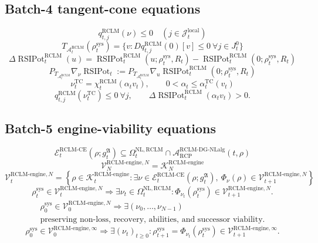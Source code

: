 \documentclass[11pt,a4paper]{article}
\newcommand{\Acal}{\mathcal A}
\newcommand{\Kcal}{\mathcal K}
\newcommand{\Vcal}{\mathcal V}
\newcommand{\RCP}{\mathrm{RCP}}
\newcommand{\RCLM}{\mathrm{RCLM}}
\newcommand{\DG}{\mathrm{DG}}
\newcommand{\sys}{\mathrm{sys}}
\newcommand{\local}{\mathrm{local}}
\newcommand{\engine}{\mathrm{engine}}
\newcommand{\NL}{\mathrm{NL}}
\newcommand{\NLalg}{\mathrm{NLalg}}
\newcommand{\TC}{\mathrm{TC}}
\newcommand{\RSIPot}{\operatorname{RSIPot}}
\newcommand{\CE}{\mathrm{CE}}
\begin{document}
\subsection*{Batch-4 tangent-cone equations}
\[
q_{t,j}^{\RCLM}(\nu)\le0
\quad(j\in\mathcal J_t^{\local})
\]
\[
T_{\Acal_t^{\RCLM}}(\rho_t^{\sys})
=
\{v:Dq_{t,j}^{\RCLM}(0)[v]\le0\ \forall j\in J_t^0\}
\]
\[
\Delta\RSIPot_t^{\RCLM}(u)
=
\RSIPot_t^{\RCLM}(u;\rho_t^{\sys},R_t)
-
\RSIPot_t^{\RCLM}(0;\rho_t^{\sys},R_t)
\]
\[
P_{T_{\Acal_t^{\RCLM}}}\nabla_\nu\RSIPot_t
:=
P_{T_{\Acal_t^{\RCLM}}}
\nabla_u\RSIPot_t^{\RCLM}(0;\rho_t^{\sys},R_t)
\]
\[
\nu_t^{\TC}=\chi_t^{\RCLM}(\alpha_t v_t),
\qquad
0<\alpha_t\le\alpha_t^{\TC}(v_t)
\]
\[
q_{t,j}^{\RCLM}(\nu_t^{\TC})\le0\ \forall j,
\qquad
\Delta\RSIPot_t^{\RCLM}(\alpha_t v_t)>0.
\]


\subsection*{Batch-5 engine-viability equations}
\[
\mathcal E_t^{\RCLM\text{-}\CE}(\rho;g_t^{\mathfrak A})
\subseteq
\Omega_t^{\NL,\RCLM}
\cap
\Acal_{\RCP}^{\RCLM\text{-}\DG\text{-}\NLalg}(t,\rho)
\]
\[
\Vcal_N^{\RCLM\text{-}\engine,N}=\Kcal_N^{\RCLM\text{-}\engine}
\]
\[
\Vcal_t^{\RCLM\text{-}\engine,N}
=
\left\{\rho\in\Kcal_t^{\RCLM\text{-}\engine}:
\exists\nu\in\mathcal E_t^{\RCLM\text{-}\CE}(\rho;g_t^{\mathfrak A}),\
\Phi_\nu(\rho)\in\Vcal_{t+1}^{\RCLM\text{-}\engine,N}\right\}
\]
\[
\rho_t^{\sys}\in\Vcal_t^{\RCLM\text{-}\engine,N}
\Longrightarrow
\exists\nu_t\in\Omega_t^{\NL,\RCLM}:
\Phi_{\nu_t}(\rho_t^{\sys})\in\Vcal_{t+1}^{\RCLM\text{-}\engine,N}.
\]
\[
\begin{gathered}
\rho_0^{\sys}\in\Vcal_0^{\RCLM\text{-}\engine,N}
\Longrightarrow
\exists(\nu_0,\ldots,\nu_{N-1})\\
\text{preserving non-loss, recovery, abilities, and successor viability.}
\end{gathered}
\]
\[
\rho_0^{\sys}\in\Vcal_0^{\RCLM\text{-}\engine,\infty}
\Longrightarrow
\exists(\nu_t)_{t\ge0}:
\rho_{t+1}^{\sys}=\Phi_{\nu_t}(\rho_t^{\sys})
\in\Vcal_{t+1}^{\RCLM\text{-}\engine,\infty}.
\]
\end{document}
